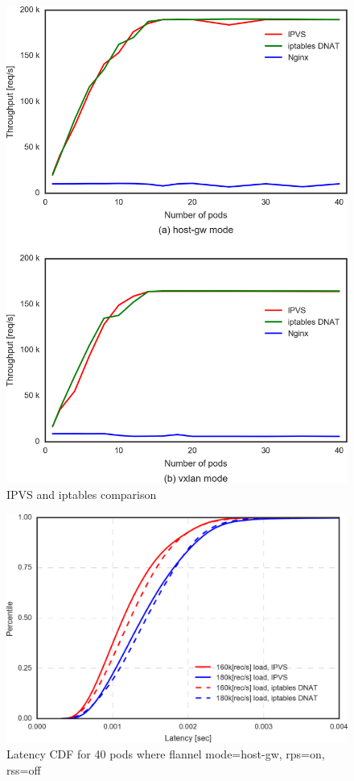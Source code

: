 \begin{figure}
\includegraphics[width=\columnwidth]{Figs/ipvs-iptables-nginx_2figs}
\caption{IPVS and iptables comparison}
\label{fig:IPVS-iptables-nginx_2figs}
\end{figure}

\begin{figure}
\includegraphics[width=\columnwidth]{Figs/latency_cdf_rps_40pods}
\caption{Latency CDF for 40 pods where flannel mode=host-gw, rps=on, rss=off}
\label{fig:latency_cdf_rps_40pods}
\end{figure}



